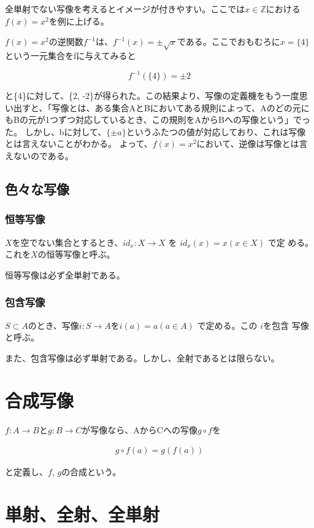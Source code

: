 \documentclass[dvipdfmx,autodetect-engine]{jsarticle}
\begin{document}
全単射でない写像を考えるとイメージが付きやすい。ここでは$x \in \mathbb{Z}$における$f(x)=x^2$を例に上げる。

$f(x) = x^2$の逆関数$f^{-1}$は、$f^{-1}(x)=\pm \sqrt{x}$である。ここでおもむろに$x=\{4\}$という一元集合をfに与えてみると

$$
f^{-1}(\{4\}) = {\pm 2}
$$

と\{4\}に対して、\{2, -2\}が得られた。この結果より、写像の定義機をもう一度思い出すと、「写像とは、ある集合AとBにおいてある規則によって、Aのどの元にもBの元が1つずつ対応しているとき、この規則をAからBへの写像という」でった。
しかし、bに対して、$\{\pm a\}$というふたつの値が対応しており、これは写像とは言えないことがわかる。
よって、$f(x) = x^2$において、逆像は写像とは言えないのである。

\subsection{色々な写像}

\subsubsection{恒等写像}

$X$を空でない集合とするとき、$id_x : X → X$ を $id_x(x) = x (x ∈ X)$ で定
める。これを$X$の恒等写像と呼ぶ。

恒等写像は必ず全単射である。

\subsubsection{包含写像}

$S \subset A$のとき、写像$i: S \to A$を$i(a) = a (a \in A)$ で定める。この $i$を包含
写像と呼ぶ。

また、包含写像は必ず単射である。しかし、全射であるとは限らない。

\section{合成写像}

$f: A \to B$と$g: B \to C$が写像なら、AからCへの写像$g \circ f$を

\begin{eqnarray*}
g \circ f(a) = g(f(a))
\end{eqnarray*}

と定義し、$f$, $g$の合成という。

\section{単射、全射、全単射}
\end{document}
